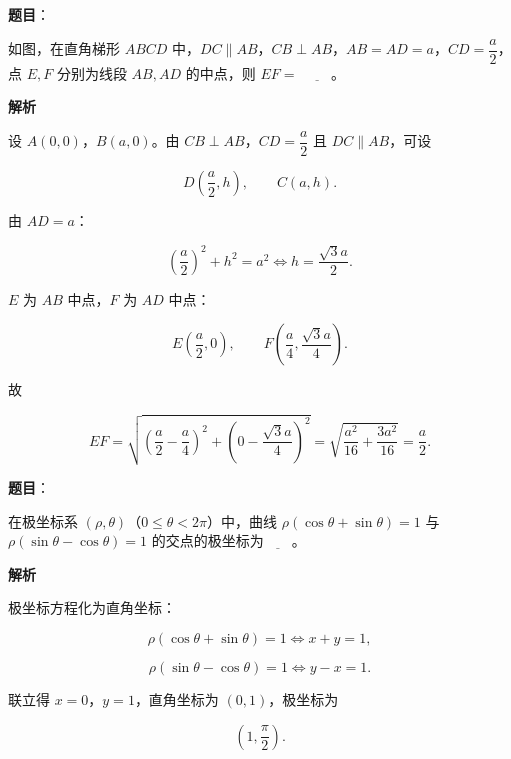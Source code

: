 \begin{answer}

\textbf{题目}：

如图，在直角梯形 $ABCD$ 中，$DC\parallel AB$，$CB\perp AB$，$AB=AD=a$，$CD=\dfrac a2$，点 $E,F$ 分别为线段 $AB,AD$ 的中点，则 $EF=$ $\underline{\qquad}$。
\nopagebreak[4]
\begin{center}\end{center}
\nopagebreak[4]
\textbf{解析}

设 $A(0,0)$，$B(a,0)$。由 $CB\perp AB$，$CD=\dfrac a2$ 且 $DC\parallel AB$，可设

\nopagebreak[4]
\[D\left(\frac a2,h\right),\qquad C\left(a,h\right).\]

由 $AD=a$：

\nopagebreak[4]
\[\left(\frac a2\right)^2+h^2=a^2\iff h=\frac{\sqrt3a}{2}.\]

$E$ 为 $AB$ 中点，$F$ 为 $AD$ 中点：

\nopagebreak[4]
\[E\left(\frac a2,0\right),\qquad F\left(\frac a4,\frac{\sqrt3a}4\right).\]

故

\nopagebreak[4]
\[EF=\sqrt{\left(\frac a2-\frac a4\right)^2+\left(0-\frac{\sqrt3a}4\right)^2}
=\sqrt{\frac{a^2}{16}+\frac{3a^2}{16}}=\frac a2.\]


\end{answer}
\begin{answer}

\textbf{题目}：

在极坐标系 $(\rho,\theta)$（$0\leqslant\theta<2\pi$）中，曲线 $\rho(\cos\theta+\sin\theta)=1$ 与 $\rho(\sin\theta-\cos\theta)=1$ 的交点的极坐标为$\underline{\qquad}$。

\textbf{解析}

极坐标方程化为直角坐标：

\nopagebreak[4]
\[\rho(\cos\theta+\sin\theta)=1\iff x+y=1,\]

\nopagebreak[4]
\[\rho(\sin\theta-\cos\theta)=1\iff y-x=1.\]

联立得 $x=0$，$y=1$，直角坐标为 $(0,1)$，极坐标为

\nopagebreak[4]
\[\left(1,\frac\pi2\right).\]


\end{answer}
